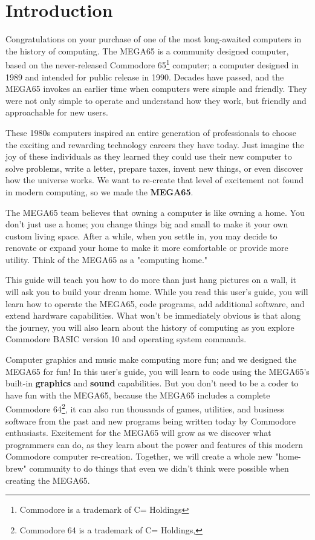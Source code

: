 \chapter{Introduction}

Congratulations on your purchase of one of the most long-awaited computers in the history of computing. The MEGA65 is a community designed computer, based on the never-released Commodore{\textregistered} 65\footnote{Commodore is a trademark of C= Holdings} computer; a computer designed in 1989 and intended for public release in 1990. Decades have passed, and the MEGA65 invokes an earlier time when computers were simple and friendly. They were not only simple to operate and understand how they work, but friendly and approachable for new users.

These 1980s computers inspired an entire generation of professionals to choose the exciting and rewarding technology careers they have today. Just imagine the joy of these individuals as they learned they could use their new computer to solve problems, write a letter, prepare taxes, invent new things, or even discover how the universe works. We want to re-create that level of excitement not found in modern computing, so we made the {\bf MEGA65}.

The MEGA65 team believes that owning a computer is like owning a home. You don't just use a home; you change things big and small to make it your own custom living space. After a while, when you settle in, you may decide to renovate or expand your home to make it more comfortable or provide more utility. Think of the MEGA65 as a "computing home."

This guide will teach you how to do more than just hang pictures on a wall, it will ask you to build your dream home. While you read this user's guide, you will learn how to operate the MEGA65, code programs, add additional software, and extend hardware capabilities. What won't be immediately obvious is that along the journey, you will also learn about the history of computing as you explore Commodore BASIC version 10 and operating system commands.

Computer graphics and music make computing more fun; and we designed the MEGA65 for fun! In this user's guide, you will learn to code using the MEGA65's built-in {\bf graphics} and {\bf sound} capabilities. But you don't need to be a coder to have fun with the MEGA65, because the MEGA65 includes a complete Commodore{\textregistered} 64{\texttrademark}\footnote{Commodore 64 is a trademark of C= Holdings, }, it can also run thousands of games, utilities, and business software from the past and new programs being written today by Commodore enthusiasts. Excitement for the MEGA65 will grow as we discover what programmers can do, as they learn about the power and features of this modern Commodore computer re-creation. Together, we will create a whole new "home-brew" community to do things that even we didn't think were possible when creating the MEGA65.

